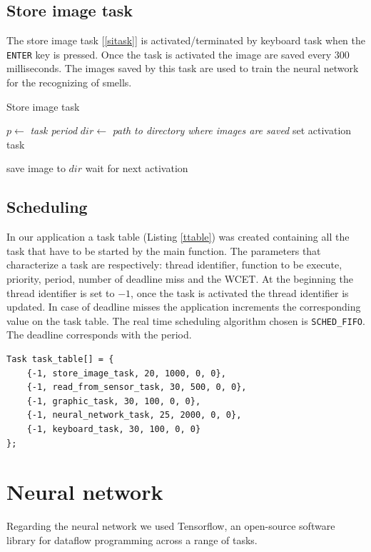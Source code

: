 \documentclass[12pt]{article}
\begin{document}
\subsection{Store image task}
The store image task [\ref{sitask}] is activated/terminated by keyboard task
when the \texttt{ENTER} key is pressed. Once the task is activated the image
are saved every $300$ milliseconds. The images saved by this task are used to
train the neural network for the recognizing of smells.

\begin{algorithm}[H]
\caption{Store image task}
\label{sitask}

\begin{algorithmic}
\State $p\gets$ \textit{task period}
\State $dir\gets$ \textit{path to directory where images are saved}
\State set activation task

\Loop
\State save image to $dir$
\State wait for next activation
\EndLoop

\end{algorithmic}
\end{algorithm}

\subsection{Scheduling}
In our application a task table (Listing \ref{ttable}) was created containing
all the task that have to be started by the main function. The parameters
that characterize a task are respectively: thread identifier, function to be
execute, priority, period, number of deadline miss and the WCET. At the
beginning the thread identifier is set to $-1$, once the task is activated
the thread identifier is updated. In case of deadline misses the application
increments the corresponding value on the task table. The real time
scheduling algorithm chosen is \texttt{SCHED\_FIFO}. The deadline corresponds
with the period.

\begin{lstlisting}[caption={Task table}, captionpos=b, label={ttable}]
Task task_table[] = {
    {-1, store_image_task, 20, 1000, 0, 0},
    {-1, read_from_sensor_task, 30, 500, 0, 0},
    {-1, graphic_task, 30, 100, 0, 0},
    {-1, neural_network_task, 25, 2000, 0, 0},
    {-1, keyboard_task, 30, 100, 0, 0}
};
\end{lstlisting}

\section{Neural network}
Regarding the neural network we used Tensorflow, an open-source software 
library for dataflow programming across a range of tasks. 
\end{document}
